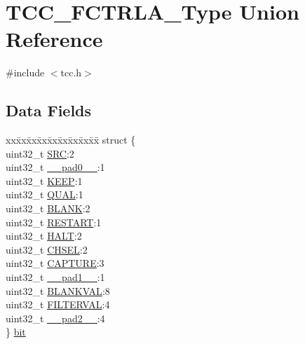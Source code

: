 \hypertarget{union_t_c_c___f_c_t_r_l_a___type}{}\section{T\+C\+C\+\_\+\+F\+C\+T\+R\+L\+A\+\_\+\+Type Union Reference}
\label{union_t_c_c___f_c_t_r_l_a___type}


{\ttfamily \#include $<$tcc.\+h$>$}

\subsection*{Data Fields}
\begin{DoxyCompactItemize}
\item 
\begin{tabbing}
xx\=xx\=xx\=xx\=xx\=xx\=xx\=xx\=xx\=\kill
struct \{\\
\>uint32\_t \mbox{\hyperlink{union_t_c_c___f_c_t_r_l_a___type_a306a1d33a25b1f2253b4b855b6e8c0d5}{SRC}}:2\\
\>uint32\_t \mbox{\hyperlink{union_t_c_c___f_c_t_r_l_a___type_a3e57c2ef1c3ffb36722f000cc1156824}{\_\_pad0\_\_}}:1\\
\>uint32\_t \mbox{\hyperlink{union_t_c_c___f_c_t_r_l_a___type_a4c5708c9d6836c3b0b6a2aa93d68a208}{KEEP}}:1\\
\>uint32\_t \mbox{\hyperlink{union_t_c_c___f_c_t_r_l_a___type_a95af12c73a0ffab9f7d13e991db9ea44}{QUAL}}:1\\
\>uint32\_t \mbox{\hyperlink{union_t_c_c___f_c_t_r_l_a___type_a19c83c8f9a20ed1d3947387614289cf0}{BLANK}}:2\\
\>uint32\_t \mbox{\hyperlink{union_t_c_c___f_c_t_r_l_a___type_ab492835f5a772d02c85d8ce8370ff02e}{RESTART}}:1\\
\>uint32\_t \mbox{\hyperlink{union_t_c_c___f_c_t_r_l_a___type_a6e45f491f9ac608334e69ee9f78040fc}{HALT}}:2\\
\>uint32\_t \mbox{\hyperlink{union_t_c_c___f_c_t_r_l_a___type_a23056283435a5ae76dbf0d9e0ae3eb0e}{CHSEL}}:2\\
\>uint32\_t \mbox{\hyperlink{union_t_c_c___f_c_t_r_l_a___type_a2db0dd0725840a5f0ecb3c763334315c}{CAPTURE}}:3\\
\>uint32\_t \mbox{\hyperlink{union_t_c_c___f_c_t_r_l_a___type_a6712ba6dd1d5b43d2d56ff8ac4e275a7}{\_\_pad1\_\_}}:1\\
\>uint32\_t \mbox{\hyperlink{union_t_c_c___f_c_t_r_l_a___type_aa247abf30aeb9f7bb81d11a85c5ab59c}{BLANKVAL}}:8\\
\>uint32\_t \mbox{\hyperlink{union_t_c_c___f_c_t_r_l_a___type_ae05a500ed332d12de0c6306919e8eb68}{FILTERVAL}}:4\\
\>uint32\_t \mbox{\hyperlink{union_t_c_c___f_c_t_r_l_a___type_a9ce12a63de64ef64ae2d59d128251cae}{\_\_pad2\_\_}}:4\\
\} \mbox{\hyperlink{union_t_c_c___f_c_t_r_l_a___type_a8c01fd7a8a896907efd5264e96981e2b}{bit}}\\


\end{tabbing}
\end{DoxyCompactItemize}
